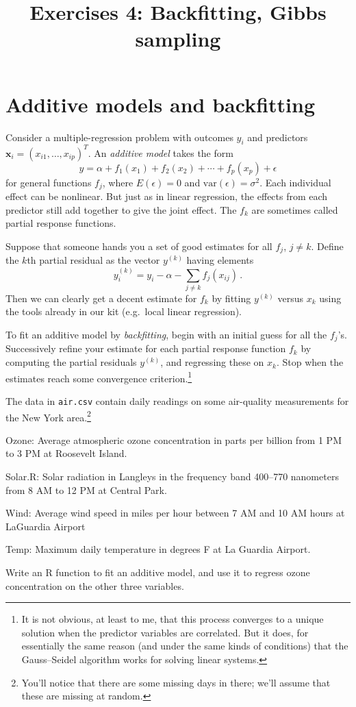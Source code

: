 \documentclass{mynotes}
\title[Exercises 4 $\cdot$ SSC 383D]{Exercises 4: Backfitting, Gibbs sampling}
\date{}  %
\newcommand{\var}{\mbox{var}}
\newcommand{\bx}{\mathbf{x}}
\begin{document}
\maketitle%

\section{Additive models and backfitting}

Consider a multiple-regression problem with outcomes $y_i$ and predictors $\bx_i = (x_{i1}, \ldots, x_{ip})^T$.  An \textit{additive model} takes the form
$$
y = \alpha + f_1(x_1) + f_2(x_2) + \cdots + f_p(x_p) + \epsilon
$$
for general functions $f_j$, where $E(\epsilon) = 0$ and $\var(\epsilon) = \sigma^2$.  Each individual effect can be nonlinear.  But just as in linear regression, the effects from each predictor still add together to give the joint effect.  The $f_k$ are sometimes called partial response functions.

Suppose that someone hands you a set of good estimates for all $f_j$, $j \neq k$.  Define the $k$th partial residual as the vector $y^{(k)}$ having elements
$$
y^{(k)}_i = y_i - \alpha - \sum_{j\neq k} f_j(x_{ij}) \, .
$$
Then we can clearly get a decent estimate for $f_k$ by fitting $y^{(k)}$ versus $x_k$ using the tools already in our kit (e.g.~local linear regression).

To fit an additive model by \textit{backfitting}, begin with an initial guess for all the $f_j$'s.  Successively refine your estimate for each partial response function $f_k$ by computing the partial residuals $y^{(k)}$, and regressing these on $x_k$.  Stop when the estimates reach some convergence criterion.\footnote{It is not obvious, at least to me, that this process converges to a unique solution when the predictor variables are correlated.  But it does, for essentially the same reason (and under the same kinds of conditions) that the Gauss--Seidel algorithm works for solving linear systems.}

The data in \verb|air.csv| contain daily readings on some air-quality measurements for the New York area.\footnote{You'll notice that there are some missing days in there; we'll assume that these are missing at random.}
\begin{compactdesc}
\item[Ozone:] Average atmospheric ozone concentration in parts per billion from 1 PM to 3 PM at Roosevelt Island.
\item[Solar.R:] Solar radiation in Langleys in the frequency band 400--770 nanometers from 8 AM to 12 PM at Central Park.
\item[Wind:] Average wind speed in miles per hour between 7 AM and 10 AM hours at LaGuardia Airport
\item[Temp:] Maximum daily temperature in degrees F at La Guardia Airport.
\end{compactdesc}
\vspace{0.5\baselineskip}
Write an R function to fit an additive model, and use it to regress ozone concentration on the other three variables.
\end{document}
